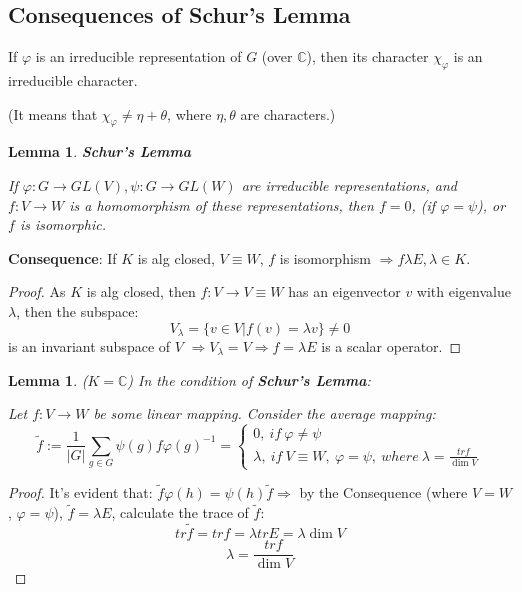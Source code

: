 \documentclass[12pt, a4paper]{article}
\newcounter{lemmacounter}
\newtheorem{lemma}[lemmacounter]{Lemma}
\theoremstyle{definition}
\begin{document}
\subsection{Consequences of Schur's Lemma}
If $\varphi$ is an irreducible representation of $G$ (over $\mathbb{C}$), then its character 
$\chi_\varphi$ is an irreducible character.
\par
(It means that $\chi_\varphi \neq \eta + \theta$, where $\eta , \theta$ are characters.)
\setcounter{lemmacounter}{0}
\begin{lemma}
    \textbf{Schur's Lemma}
    \par
    If $\varphi: G\rightarrow GL(V),\psi :G\rightarrow GL(W)$ are irreducible representations,
    and $f:V\rightarrow W$ is a homomorphism of these representations, then $f=0$, (if $
    \varphi=\psi$), or $f$ is isomorphic. 
\end{lemma}
\textbf{Consequence}: If $K$ is alg closed, $V\equiv W$, $f$ is isomorphism $\Rightarrow f \lambda 
E, \lambda \in K$.
\begin{proof}
    As $K$ is alg closed, then $f: V\rightarrow V \equiv W$ has an eigenvector $v$ with 
    eigenvalue $\lambda$, then the subspace:
    \[V_\lambda = \{v\in V| f(v) = \lambda v\}\neq 0\]
    is an invariant subspace of $V$ $\Rightarrow V_\lambda = V \Rightarrow f = \lambda E$
    is a scalar operator.
\end{proof}
\begin{lemma}
    ($K = \mathbb{C}$) In the condition of \textbf{Schur's Lemma}:
    \par
    Let $f:V\rightarrow W$ be some linear mapping. Consider the average mapping:
    \[
        \widetilde{f}:= \frac1{|G|}\sum_{g \in G} \psi(g)f{\varphi(g)}^{-1} = 
        \begin{cases}
            0,\ if\ \varphi \neq \psi \\
            \lambda,\ if\ V\equiv W,\ \varphi = \psi,\ where\ \lambda = \frac{tr f}{\dim V} 
        \end{cases}
    \]
\end{lemma}
\begin{proof}
    It's evident that:
    $\widetilde{f}\varphi(h) = \psi(h)\widetilde{f} \Rightarrow$ by the Consequence (where 
    $V= W$, $\varphi = \psi$), $\widetilde{f} = \lambda E$, calculate the trace of 
    $\widetilde{f}$:
    \[tr \widetilde{f} = trf = \lambda tr E = \lambda \dim V \]
    \[\lambda = \frac{trf}{\dim V}\]
\end{proof}
\end{document}
